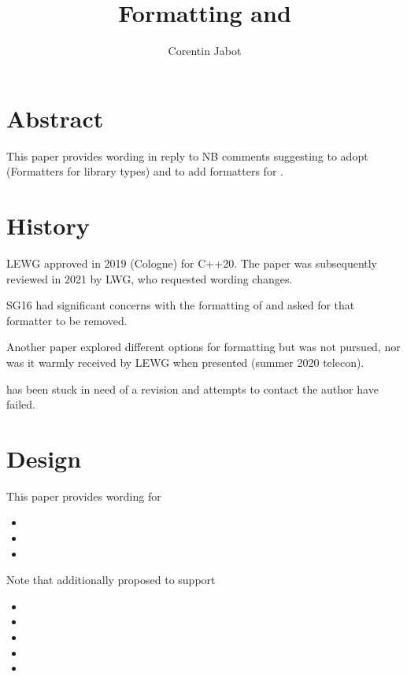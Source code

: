 \documentclass{wg21}
\title{Formatting \tcode{thread::id} and \tcode{stacktrace}}
\author{Corentin Jabot}{corentin.jabot@gmail.com}
\begin{document}
\maketitle

\section{Abstract}

This paper provides wording in reply to NB comments suggesting to adopt  (Formatters for library types)
and to add formatters for .

\section{History}

LEWG approved  in 2019 (Cologne) for C++20.
The paper was subsequently reviewed in 2021 by LWG, who requested wording changes.

SG16 had significant concerns with the formatting of  and asked for that formatter to be removed.

Another paper  explored different options for formatting  but was not pursued, nor was it warmly
received by LEWG when presented (summer 2020 telecon).

 has been stuck in need of a revision and attempts to contact the author have failed.


\section{Design}

This paper provides wording for
\begin{itemize}
\item {}
\item {}
\item {}
\end{itemize}

Note that  additionally proposed to support

\begin{itemize}
\item {}
\item {}
\item {}
\item {}
\item {}
\end{itemize}
\end{document}
